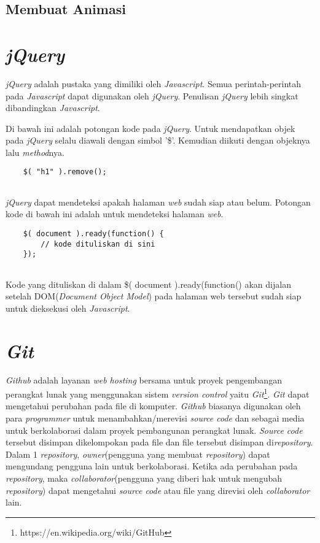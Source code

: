 \subsection{Membuat Animasi}

\section{\textit{jQuery}}
\textit{jQuery} adalah pustaka yang dimiliki oleh \textit{Javascript}. Semua perintah-perintah pada \textit{Javascript} dapat digunakan oleh \textit{jQuery}. Penulisan \textit{jQuery} lebih singkat dibandingkan \textit{Javascript}.

Di bawah ini adalah potongan kode pada \textit{jQuery}. Untuk mendapatkan objek pada \textit{jQuery} selalu diawali dengan simbol '\$'. Kemudian diikuti dengan objeknya lalu \textit{method}nya. 

\begin{lstlisting}
	$( "h1" ).remove();
	
\end{lstlisting}

\textit{jQuery} dapat mendeteksi apakah halaman \textit{web} sudah siap atau belum. Potongan kode di bawah ini adalah untuk mendeteksi halaman \textit{web}.

\begin{lstlisting}
	$( document ).ready(function() {
    	// kode dituliskan di sini
	});
	
\end{lstlisting}

Kode yang dituliskan di dalam \$( document ).ready(function() akan dijalan setelah DOM(\textit{Document Object Model}) pada halaman web tersebut sudah siap untuk dieksekusi oleh \textit{Javascript}. 

\section{\textit{Git}}
\label{sec:Git}
\textit{Github} adalah layanan \textit{web hosting} bersama untuk proyek pengembangan perangkat lunak yang menggunakan sistem \textit{version control} yaitu \textit{Git}\footnote{https://en.wikipedia.org/wiki/GitHub}. \textit{Git} dapat mengetahui perubahan pada file di komputer. \textit{Github} biasanya digunakan oleh para \textit{programmer} untuk menambahkan/merevisi \textit{source code} dan sebagai media untuk berkolaborasi dalam proyek pembangunan perangkat lunak. \textit{Source code} tersebut disimpan dikelompokan pada file dan file tersebut disimpan di\textit{repository}. Dalam 1 \textit{repository}, \textit{owner}(pengguna yang membuat \textit{repository}) dapat mengundang pengguna lain untuk berkolaborasi. Ketika ada perubahan pada \textit{repository}, maka \textit{collaborator}(pengguna yang diberi hak untuk mengubah \textit{repository}) dapat mengetahui \textit{source code} atau file yang direvisi oleh \textit{collaborator} lain.\\


